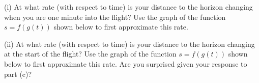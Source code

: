 \documentclass{ximera}
\begin{document}
\begin{question}
(i) At what rate (with respect to time) is your distance to the horizon changing when you are one minute into the flight? Use the graph of the function $s=f(g(t))$ shown below to first approximate this rate.

(ii)  At what rate (with respect to time) is your distance to the horizon changing at the start of the flight? Use the graph of the function $s=f(g(t))$ shown below to first approximate this rate. Are you surprised given your response to part (c)?

\begin{onlineOnly}
    \begin{center}
\end{center}
\end{onlineOnly}


\end{question}
\end{document}
